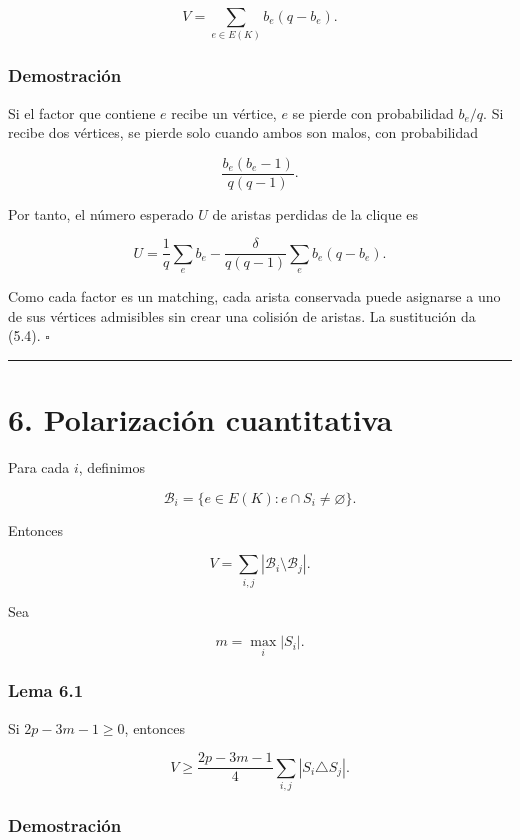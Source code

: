 \documentclass[
  11pt,
]{article}
\begin{document}
\[
V=\sum_{e\in E(K)}b_e(q-b_e).
\tag{5.5}
\]

\subsubsection{Demostración}\label{demostraciuxf3n-4}

Si el factor que contiene \(e\) recibe un vértice, \(e\) se pierde con
probabilidad \(b_e/q\). Si recibe dos vértices, se pierde solo cuando
ambos son malos, con probabilidad

\[
\frac{b_e(b_e-1)}{q(q-1)}.
\]

Por tanto, el número esperado \(U\) de aristas perdidas de la clique es

\[
U
=
\frac1q\sum_e b_e
-
\frac{\delta}{q(q-1)}\sum_e b_e(q-b_e).
\]

Como cada factor es un matching, cada arista conservada puede asignarse
a uno de sus vértices admisibles sin crear una colisión de aristas. La
sustitución da (5.4). \(\square\)

\begin{center}\rule{0.5\linewidth}{0.5pt}\end{center}

\section{6. Polarización
cuantitativa}\label{polarizaciuxf3n-cuantitativa}

Para cada \(i\), definimos

\[
\mathcal B_i=\{e\in E(K):e\cap S_i\ne\varnothing\}.
\]

Entonces

\[
V=\sum_{i,j}|\mathcal B_i\setminus\mathcal B_j|.
\tag{6.1}
\]

Sea

\[
m=\max_i|S_i|.
\]

\subsubsection{Lema 6.1}\label{lema-6.1-desigualdad-de-polarizaciuxf3n}

Si \(2p-3m-1\ge0\), entonces

\[
\boxed{
V
\ge
\frac{2p-3m-1}{4}
\sum_{i,j}|S_i\triangle S_j|.
}
\tag{6.2}
\]

\subsubsection{Demostración}\label{demostraciuxf3n-5}
\end{document}
